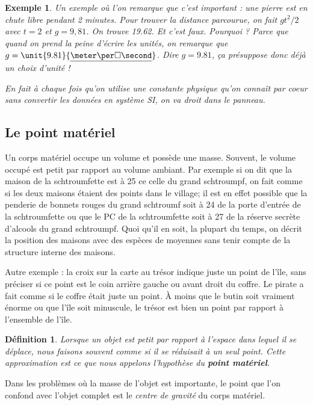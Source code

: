 \documentclass[a4paper,12pt]{book}
\newcounter{numtho}
\theoremstyle{mes_exemples}	\newtheorem{exemple}[numtho]{Exemple}
\theoremstyle{mes_tho}
\newtheorem{definition}[numtho]{Définition}
\newcommand{\defe}[2]{\textbf{#1}\index{#2}}
\begin{document}
\begin{exemple}
Un exemple où l'on remarque que c'est important : une pierre est en chute libre pendant 2 minutes. Pour trouver la distance parcourue, on fait $gt^2/2$ avec $t=2$ et $g=9,81$. On trouve 19.62. Et c'est faux. Pourquoi ? Parce que quand on prend la peine d'écrire les unités, on remarque que $g=\unit{9.81}{\underline{\meter\per\square\second}}$. Dire \og $g=9.81$\fg, ça présuppose donc déjà un choix d'unité !

En fait à chaque fois qu'on utilise une constante physique \og qu'on connaît par coeur\fg{} sans convertir les données en système SI, on va droit dans le panneau.
\end{exemple}

\subsection{Le point matériel}


Un corps matériel occupe un volume et possède une masse. Souvent, le volume occupé est petit par rapport au volume ambiant. Par exemple si on dit que la maison de la schtroumfette est à \unit{25}{\meter} ce celle du grand schtroumpf, on fait \og comme si\fg{} les deux maisons étaient des points dans le village; il est en effet possible que la penderie de bonnets rouges du grand schtroumf soit à \unit{24}{\meter} de la porte d'entrée de la schtroumfette ou que le PC de la schtroumfette soit à \unit{27}{\meter} de la réserve secrète d'alcools du grand schtroumpf. Quoi qu'il en soit, la plupart du temps,  on décrit la position des maisons avec des espèces de moyennes sans tenir compte de la structure interne des maisons.

Autre exemple : la croix sur la carte au trésor indique juste un point de l'île, sans préciser si ce point est le coin arrière gauche ou avant droit du coffre. Le pirate a fait comme si le coffre était juste un point. À moins que le butin soit vraiment énorme ou que l'île soit minuscule, le trésor est bien un point par rapport à l'ensemble de l'île.

\begin{definition}
Lorsque un objet est petit par rapport à l'espace dans lequel il se déplace, nous faisons souvent comme si il se réduisait à un seul point. Cette approximation est ce que nous appelons l'hypothèse du \defe{point matériel}{Point matériel}. 
\end{definition}

Dans les problèmes où la masse de l'objet est importante, le point que l'on confond avec l'objet complet est le \emph{centre de gravité} du corps matériel.
\end{document}
